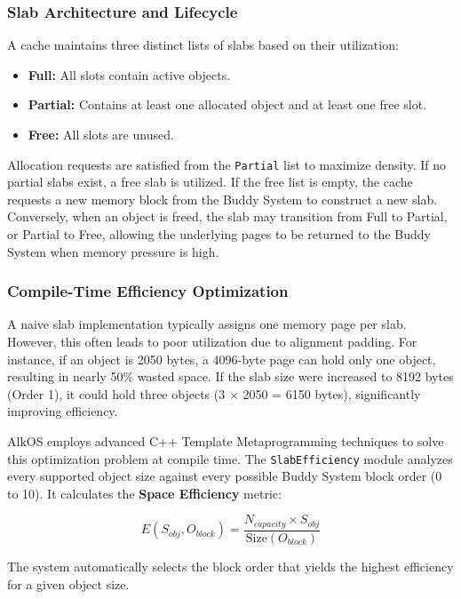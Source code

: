 \documentclass[a4paper,10pt,twoside]{report}
\theoremstyle{definition}
\begin{document}
\subsubsection{Slab Architecture and Lifecycle}

A cache maintains three distinct lists of slabs based on their utilization:
\begin{itemize}
    \item \textbf{Full:} All slots contain active objects.
    \item \textbf{Partial:} Contains at least one allocated object and at least one free slot.
    \item \textbf{Free:} All slots are unused.
\end{itemize}

Allocation requests are satisfied from the \texttt{Partial} list to maximize density. If no partial slabs exist, a free slab is utilized. If the free list is empty, the cache requests a new memory block from the Buddy System to construct a new slab. Conversely, when an object is freed, the slab may transition from Full to Partial, or Partial to Free, allowing the underlying pages to be returned to the Buddy System when memory pressure is high.

\subsubsection{Compile-Time Efficiency Optimization}

A naive slab implementation typically assigns one memory page per slab. However, this often leads to poor utilization due to alignment padding. For instance, if an object is 2050 bytes, a 4096-byte page can hold only one object, resulting in nearly 50\% wasted space. If the slab size were increased to 8192 bytes (Order 1), it could hold three objects (3 $\times$ 2050 = 6150 bytes), significantly improving efficiency.

AlkOS employs advanced C++ Template Metaprogramming techniques to solve this optimization problem at compile time. The \texttt{SlabEfficiency} module analyzes every supported object size against every possible Buddy System block order (0 to 10). It calculates the \textbf{Space Efficiency} metric:

\begin{equation}
    E(S_{obj}, O_{block}) = \frac{N_{capacity} \times S_{obj}}{\text{Size}(O_{block})}
\end{equation}

The system automatically selects the block order that yields the highest efficiency for a given object size.
\end{document}
